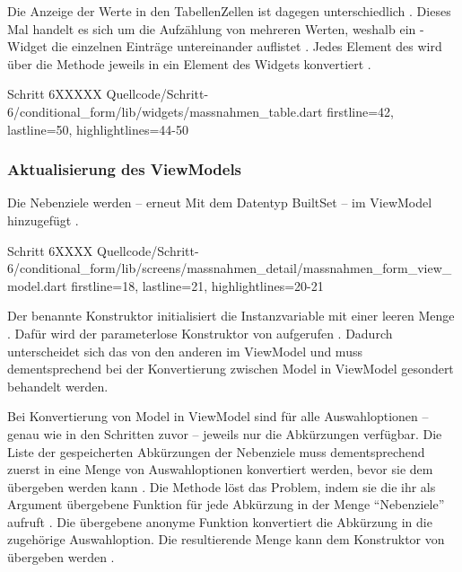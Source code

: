 Die Anzeige der Werte in den TabellenZellen ist dagegen unterschiedlich \Lst{\ref{lst:Schritt6buildSelectableCell}}.
Dieses Mal handelt es sich um die Aufzählung von mehreren Werten,
weshalb ein -Widget die einzelnen Einträge untereinander auflistet .
Jedes Element des    wird über die Methode  jeweils in ein Element des Widgets  konvertiert .

\begin{alexlisting}{Schritt 6}{XXXXX}
  {Quellcode/Schritt-6/conditional_form/lib/widgets/massnahmen_table.dart}
  {firstline=42, lastline=50, highlightlines={44-50}}
  \label{lst:Schritt6buildSelectableCell}
\end{alexlisting}

\subsubsection{Aktualisierung des ViewModels}

Die Nebenziele werden -- erneut Mit dem Datentyp BuiltSet -- im ViewModel hinzugefügt \Lst{\ref{lst:Schritt6BehaviorSubjectNebenziele}}.
\begin{alexlisting}{Schritt 6}{XXXX}
  {Quellcode/Schritt-6/conditional_form/lib/screens/massnahmen_detail/massnahmen_form_view_model.dart}
  {firstline=18, lastline=21, highlightlines={20-21}}
  \label{lst:Schritt6BehaviorSubjectNebenziele}
\end{alexlisting}

Der benannte Konstruktor  initialisiert die Instanzvariable mit  einer leeren Menge .
Dafür wird der parameterlose Konstruktor von  aufgerufen .
Dadurch unterscheidet sich das  von den anderen im ViewModel
und muss dementsprechend bei der Konvertierung zwischen Model in ViewModel gesondert behandelt werden.

Bei Konvertierung von Model in ViewModel sind für alle Auswahloptionen -- genau wie in den Schritten zuvor -- jeweils nur die Abkürzungen verfügbar.
Die Liste der gespeicherten Abkürzungen der Nebenziele muss dementsprechend zuerst in eine Menge von Auswahloptionen konvertiert werden,
bevor sie dem  übergeben werden kann \Lst{\ref{lst:Schritt6setModel}}.
Die Methode  löst das Problem,
indem sie die ihr als Argument übergebene Funktion für jede Abkürzung in der Menge \enquote{Nebenziele} aufruft .
Die übergebene anonyme Funktion konvertiert die Abkürzung in die zugehörige Auswahloption.
Die resultierende Menge kann dem Konstruktor von  übergeben werden .

